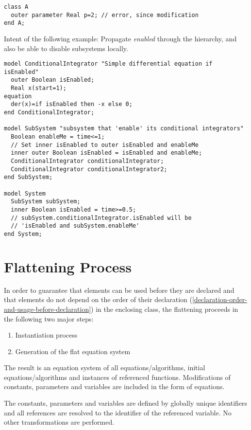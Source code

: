 \begin{example}
\begin{lstlisting}[language=modelica]
class A
  outer parameter Real p=2; // error, since modification
end A;
\end{lstlisting}

Intent of the following example: Propagate \emph{enabled} through
the hierarchy, and also be able to disable subsystems locally.
\begin{lstlisting}[language=modelica]
model ConditionalIntegrator "Simple differential equation if isEnabled"
  outer Boolean isEnabled;
  Real x(start=1);
equation
  der(x)=if isEnabled then -x else 0;
end ConditionalIntegrator;

model SubSystem "subsystem that 'enable' its conditional integrators"
  Boolean enableMe = time<=1;
  // Set inner isEnabled to outer isEnabled and enableMe
  inner outer Boolean isEnabled = isEnabled and enableMe;
  ConditionalIntegrator conditionalIntegrator;
  ConditionalIntegrator conditionalIntegrator2;
end SubSystem;

model System
  SubSystem subSystem;
  inner Boolean isEnabled = time>=0.5;
  // subSystem.conditionalIntegrator.isEnabled will be
  // 'isEnabled and subSystem.enableMe'
end System;
\end{lstlisting}
\end{example}

\section{Flattening Process}

In order to guarantee that elements can be used before they are declared
and that elements do not depend on the order of their declaration
(\autoref{declaration-order-and-usage-before-declaration}) in the enclosing class, the flattening proceeds in the
following two major steps:
\begin{enumerate}
\item
  Instantiation process
\item
  Generation of the flat equation system
\end{enumerate}

The result is an equation system of all equations/algorithms, initial
equations/algorithms and instances of referenced functions.
Modifications of constants, parameters and variables are included in the
form of equations.

The constants, parameters and variables are defined by globally unique
identifiers and all references are resolved to the identifier of the
referenced variable. No other transformations are performed.

